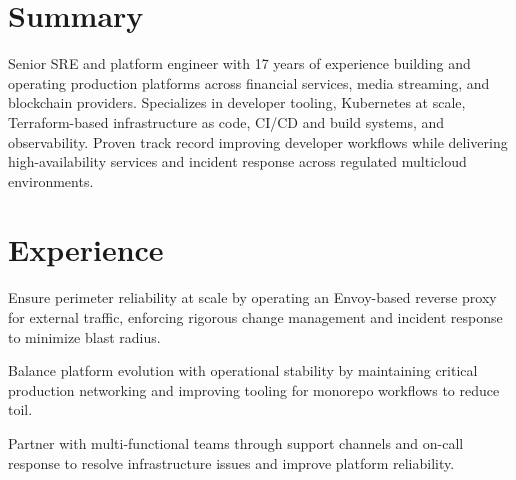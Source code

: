 \documentclass[]{willianpaixao-resume}
\begin{document}
\begin{minipage}[t]{0.68\textwidth}

\section{Summary}
Senior SRE and platform engineer with 17 years of experience building and operating production platforms across financial services, media streaming, and blockchain providers. Specializes in developer tooling, Kubernetes at scale, Terraform-based infrastructure as code, CI/CD and build systems, and observability. Proven track record improving developer workflows while delivering high-availability services and incident response across regulated multicloud environments.
\sectionsep
\section{Experience}
\sectionsep
{}
\vspace{1pt}
\begin{tightemize}
\item Ensure perimeter reliability at scale by operating an Envoy-based reverse proxy for external traffic, enforcing rigorous change management and incident response to minimize blast radius.
\item Balance platform evolution with operational stability by maintaining critical production networking and improving tooling for monorepo workflows to reduce toil.
\item Partner with multi-functional teams through support channels and on-call response to resolve infrastructure issues and improve platform reliability.
\end{tightemize}
\sectionsep



\end{minipage}
\end{document}

